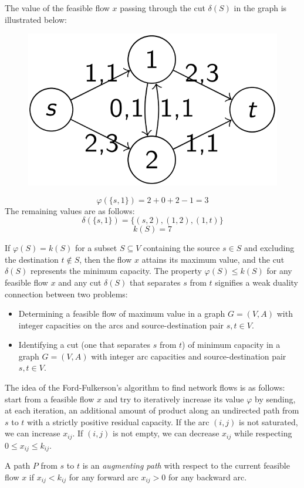\documentclass[12pt, a4paper]{report}
\begin{document}
    \begin{example}
        The value of the feasible flow $x$ passing through the cut $\delta(S)$  in the graph is illustrated below:
        \begin{figure}[H]
            \centering
            \includegraphics[width=0.25\linewidth]{images/flow.png}
        \end{figure}
        \[\varphi(\{s,1\})=2+0+2-1=3\]
        The remaining values are as follows: 
        \[\delta(\{s,1\})=\{(s, 2),(1,2),(1, t)\}\]
        \[k(S)=7\]
    \end{example}
    If $\varphi(S) = k(S)$ for a subset $S \subseteq V$ containing the source $s \in S$ and excluding the destination $t \notin S$, then the flow $x$ attains its maximum value, and the cut $\delta(S)$ represents the minimum capacity. 
    The property $\varphi(S) \leq k(S)$ for any feasible flow $x$ and any cut $\delta(S)$ that separates $s$ from $t$ signifies a weak duality connection between two problems:
    \begin{itemize}
        \item Determining a feasible flow of maximum value in a graph $G = (V, A)$ with integer capacities on the arcs and source-destination pair $s, t \in V$.
        \item Identifying a cut (one that separates $s$ from $t$) of minimum capacity in a graph $G = (V, A)$ with integer arc capacities and source-destination pair $s, t \in V$.
    \end{itemize} 
    The idea of the Ford-Fulkerson's algorithm to find network flows is as follows: start from a feasible flow $x$ and try to iteratively increase its value $\varphi$ by sending, at each iteration, an additional amount of product along an undirected path from $s$ to $t$ with a strictly positive residual capacity. 
    If the arc $(i,j)$ is not saturated, we can increase $x_{ij}$. 
    If $(i,j)$ is not empty, we can decrease $x_{ij}$ while respecting $0 \leq x_{ij} \leq k_{ij}$. 
    \begin{definition}
        A path $P$ from $s$ to $t$ is an \emph{augmenting path} with respect to the current feasible flow $x$ if $x_{ij} <  k_{ij}$ for any
        forward arc $x_{ij}>0$ for any backward arc. 
    \end{definition}
\end{document}
